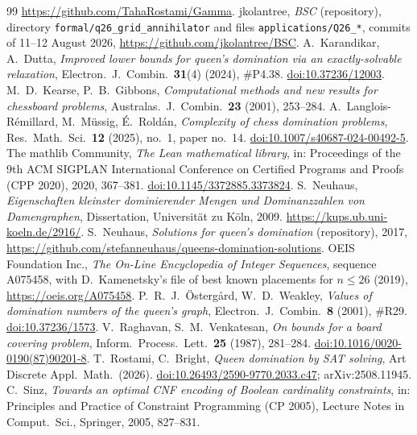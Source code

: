 \documentclass[11pt]{article}
\theoremstyle{definition}
\theoremstyle{remark}
\begin{document}
\begin{thebibliography}{99}
\url{https://github.com/TahaRostami/Gamma}.
 jkolantree, \emph{BSC} (repository), directory \texttt{formal/q26\_grid\_annihilator} and files
\texttt{applications/Q26\_*}, commits of 11--12 August 2026, \url{https://github.com/jkolantree/BSC}.
 A.~Karandikar, A.~Dutta, \emph{Improved lower bounds for queen's domination via an
exactly-solvable relaxation}, Electron.\ J.\ Combin.\ \textbf{31}(4) (2024), \#P4.38.
\href{https://doi.org/10.37236/12003}{doi:10.37236/12003}.
 M.~D.~Kearse, P.~B.~Gibbons, \emph{Computational methods and new results for chessboard
problems}, Australas.\ J.\ Combin.\ \textbf{23} (2001), 253--284.
 A.~Langlois-R\'emillard, M.~M\"ussig, \'E.~Rold\'an, \emph{Complexity of chess domination
problems}, Res.\ Math.\ Sci.\ \textbf{12} (2025), no.~1, paper no.~14.
\href{https://doi.org/10.1007/s40687-024-00492-5}{doi:10.1007/s40687-024-00492-5}.
 The mathlib Community, \emph{The Lean mathematical library}, in: Proceedings of the 9th
ACM SIGPLAN International Conference on Certified Programs and Proofs (CPP 2020), 2020, 367--381.
\href{https://doi.org/10.1145/3372885.3373824}{doi:10.1145/3372885.3373824}.
 S.~Neuhaus, \emph{Eigenschaften kleinster dominierender Mengen und Dominanzzahlen von
Damengraphen}, Dissertation, Universit\"at zu K\"oln, 2009. \url{https://kups.ub.uni-koeln.de/2916/}.
 S.~Neuhaus, \emph{Solutions for queen's domination} (repository), 2017,
\url{https://github.com/stefanneuhaus/queens-domination-solutions}.
 OEIS Foundation Inc., \emph{The On-Line Encyclopedia of Integer Sequences}, sequence
A075458, with D.~Kamenetsky's file of best known placements for $n\le26$ (2019),
\url{https://oeis.org/A075458}.
 P.~R.~J.~\"Osterg\aa rd, W.~D.~Weakley, \emph{Values of domination numbers of the queen's graph},
Electron.\ J.\ Combin.\ \textbf{8} (2001), \#R29.
\href{https://doi.org/10.37236/1573}{doi:10.37236/1573}.
 V.~Raghavan, S.~M.~Venkatesan, \emph{On bounds for a board covering problem}, Inform.\ Process.\
Lett.\ \textbf{25} (1987), 281--284.
\href{https://doi.org/10.1016/0020-0190(87)90201-8}{doi:10.1016/0020-0190(87)90201-8}.
\bibitem{RB} T.~Rostami, C.~Bright, \emph{Queen domination by SAT solving}, Art Discrete Appl.\ Math.\
(2026). \href{https://doi.org/10.26493/2590-9770.2033.c47}{doi:10.26493/2590-9770.2033.c47};
arXiv:2508.11945.
\bibitem{Sinz} C.~Sinz, \emph{Towards an optimal CNF encoding of Boolean cardinality constraints}, in:
Principles and Practice of Constraint Programming (CP 2005), Lecture Notes in Comput.\ Sci., Springer, 2005, 827--831.

\end{thebibliography}
\end{document}
